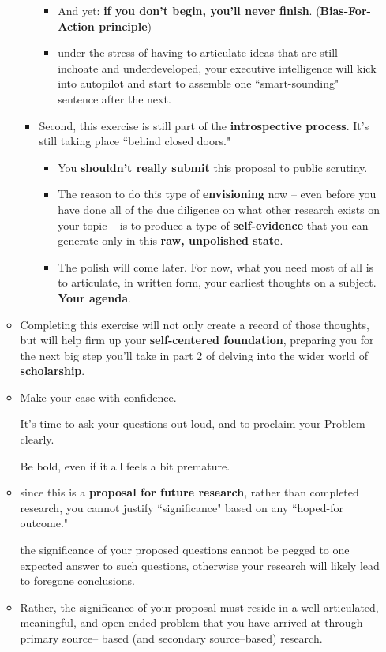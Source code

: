 \documentclass[11pt]{article}
\begin{document}
\begin{itemize}
\begin{exercise}
\begin{itemize}
\begin{itemize}
\begin{itemize}
\item And yet: \textbf{if you don’t begin, you’ll never finish}. (\textbf{Bias-For-Action principle})

\item under the stress of having to articulate ideas that are still inchoate and underdeveloped, your executive intelligence will kick into autopilot and start to assemble one ``smart-sounding" sentence after the next. 
\end{itemize}

\item Second, this exercise is still part of the \textbf{introspective process}.  It’s still taking place ``behind closed doors." 
\begin{itemize}
\item You \textbf{shouldn’t really submit} this proposal to public scrutiny. 

\item The reason to do this type of \textbf{envisioning} now -- even before you have done all of the due diligence on what other research exists on your topic -- is to produce a type of \textbf{self-evidence} that you can generate only in this \textbf{raw, unpolished state}.

\item The polish will come later. For now, what you need most of all is to articulate, in written form, your earliest thoughts on a subject. \textbf{Your agenda}.
\end{itemize}
\end{itemize}

\item Completing this exercise will not only create a record of those thoughts, but will help firm up your \textbf{self-centered foundation}, preparing you for the next big step you’ll take in part 2 of delving into the wider world of \textbf{scholarship}.

\item Make your case with confidence. 

It’s time to ask your questions out loud, and to proclaim your Problem clearly. 

Be bold, even if it all feels a bit premature.

\item since this is a \textbf{proposal for future research}, rather than completed research, you cannot justify ``significance" based on any ``hoped-for outcome." 

the significance of your proposed questions cannot be pegged to one expected answer to such questions, otherwise your research will likely lead to foregone conclusions. 

\item Rather, the significance of your proposal must reside in a well-articulated, meaningful, and open-ended problem that you have arrived at through primary source– based (and secondary source–based) research.
\end{itemize}
\end{exercise}
\end{itemize}
\end{document}

